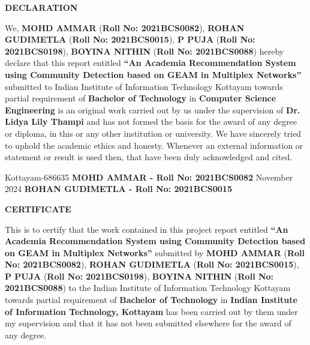 \documentclass[12pt,a4wide]{report}
\theoremstyle{plain}
\theoremstyle{definition}
\theoremstyle{remark}
\begin{document}
\clearpage
 \setcounter{page}{2}
\begin{center}
{\large{\bf{DECLARATION}}}
\end{center}


\noindent We, \textbf{MOHD AMMAR} (\textbf{Roll No: 2021BCS0082}), \textbf{ROHAN GUDIMETLA} (\textbf{Roll No: 2021BCS0015}), \textbf{P PUJA} (\textbf{Roll No: 2021BCS0198}), \textbf{BOYINA NITHIN} (\textbf{Roll No: 2021BCS0088})  hereby declare that this report entitled
\textbf{``An Academia Recommendation System using Community Detection based on GEAM in Multiplex Networks''} submitted to Indian
Institute of Information Technology Kottayam towards partial
requirement of {\bf Bachelor of Technology} in \textbf{Computer Science Engineering}
is an original work carried out by us under the supervision of
\textbf{Dr. Lidya Lily Thampi} and has not formed the basis for the award
of any degree or diploma, in this or any other institution or
university. We have sincerely tried to uphold the academic ethics
and honesty. Whenever an external information or statement or
result is used then, that have been duly acknowledged and cited.

\vspace{4cm}

\noindent Kottayam-686635 
\hfill 
\textbf{MOHD AMMAR - Roll No: 2021BCS0082}
\noindent November  2024
\hfill
\textbf{ROHAN GUDIMETLA - Roll No: 2021BCS0015}
\clearpage


 \setcounter{page}{3}
\begin{center}
{\large{\bf{CERTIFICATE}}}
\end{center}


\noindent This is to certify that the work contained in this
project report entitled \textbf{``An Academia Recommendation System using
Community Detection based on GEAM in
Multiplex Networks''}
submitted by \textbf{MOHD AMMAR} (\textbf{Roll No: 2021BCS0082}), \textbf{ROHAN GUDIMETLA} (\textbf{Roll No: 2021BCS0015}), \textbf{P PUJA} (\textbf{Roll No: 2021BCS0198}), \textbf{BOYINA NITHIN} (\textbf{Roll No: 2021BCS0088}) to the Indian Institute of Information Technology Kottayam
towards partial requirement of {\bf Bachelor of
Technology} in
\textbf{Indian Institute
of Information Technology, Kottayam} has been carried out by them under my supervision and that it has not been submitted elsewhere for the
award of any degree.
\end{document}
